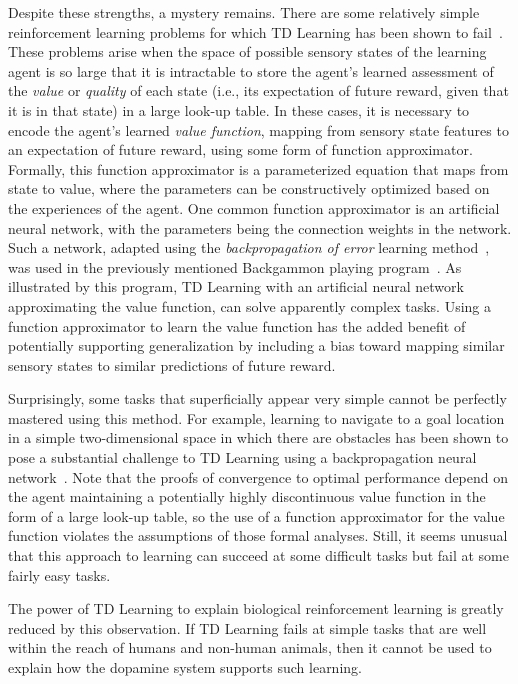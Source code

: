 \documentclass[preprint,12pt,authoryear]{elsarticle}
\begin{document}
Despite these strengths, a mystery remains. There are some relatively
simple reinforcement learning problems for which TD Learning has been
shown to fail~\citep{Boyan:1995:Approximating}. These problems arise
when the space of possible sensory states of the learning agent is so
large that it is intractable to store the agent's learned assessment
of the \emph{value} or \emph{quality} of each state (i.e., its
expectation of future reward, given that it is in that state) in a
large look-up table. In these cases, it is necessary to encode the
agent's learned \emph{value function}, mapping from sensory state
features to an expectation of future reward, using some form of
function approximator. Formally, this function approximator is a
parameterized equation that maps from state to value, where the
parameters can be constructively optimized based on the experiences of
the agent. One common function approximator is an artificial neural
network, with the parameters being the connection weights in the
network. Such a network, adapted using the \emph{backpropagation of
error} learning method~\citep{RumelhartDE:1986:BP}, was used in the
previously mentioned Backgammon playing
program~\citep{TesauroG:1995:TDGammon}. As illustrated by this program,
TD Learning with an artificial neural network approximating the value
function, can solve apparently complex tasks. Using a function
approximator to learn the value function has the added benefit of
potentially supporting generalization by including a bias toward
mapping similar sensory states to similar predictions of future
reward.

Surprisingly, some tasks that superficially appear very simple cannot
be perfectly mastered using this method. For example, learning to
navigate to a goal location in a simple two-dimensional space in which
there are obstacles has been shown to pose a substantial challenge to
TD Learning using a backpropagation neural
network~\citep{Boyan:1995:Approximating}. Note that the proofs of
convergence to optimal performance depend on the agent maintaining a
potentially highly discontinuous value function in the form of a large
look-up table, so the use of a function approximator for the value
function violates the assumptions of those formal analyses. Still, it
seems unusual that this approach to learning can succeed at some
difficult tasks but fail at some fairly easy tasks.

The power of TD Learning to explain biological reinforcement learning
is greatly reduced by this observation. If TD Learning fails at simple
tasks that are well within the reach of humans and non-human animals,
then it cannot be used to explain how the dopamine system supports
such learning.
\end{document}
